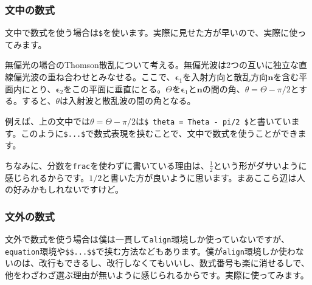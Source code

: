 \documentclass[a4paper,papersize,uplatex,dvipdfmx,10pt]{jsarticle}
\newcommand{\bs}{\symbol{92}} %
\begin{document}
\subsubsection{文中の数式} %
文中で数式を使う場合は\texttt{\$}を使います。実際に見せた方が早いので、実際に使ってみます。

\begin{screen}
  無偏光の場合のThomson散乱について考える。無偏光波は2つの互いに独立な直線偏光波の重ね合わせとみなせる。ここで、$\bm{\epsilon}_{1}$を入射方向と散乱方向$\bm{n}$を含む平面内にとり、$\bm{\epsilon}_{2}$をこの平面に垂直にとる。$\Theta$を$\bm{\epsilon}_{1}$と$\bm{n}$の間の角、$\theta = \Theta - \pi/2$とする。すると、$\theta$は入射波と散乱波の間の角となる。
\end{screen}

例えば、上の文中では$\theta = \Theta - \pi/2$は\texttt{\$ \bs theta = \bs Theta - \bs pi/2 \$}と書いています。このように\texttt{\$...\$}で数式表現を挟むことで、文中で数式を使うことができます。\par
ちなみに、分数を\texttt{\bs frac}を使わずに書いている理由は、$\frac{1}{2}$という形がダサいように感じられるからです。$1/2$と書いた方が良いように思います。まあここら辺は人の好みかもしれないですけど。

\subsubsection{文外の数式} %
文外で数式を使う場合は僕は一貫して\texttt{align}環境しか使っていないですが、\texttt{equation}環境や\texttt{\$\$...\$\$}で挟む方法などもあります。僕が\texttt{align}環境しか使わないのは、改行もできるし、改行しなくてもいいし、数式番号も楽に消せるしで、他をわざわざ選ぶ理由が無いように感じられるからです。実際に使ってみます。
\end{document}

